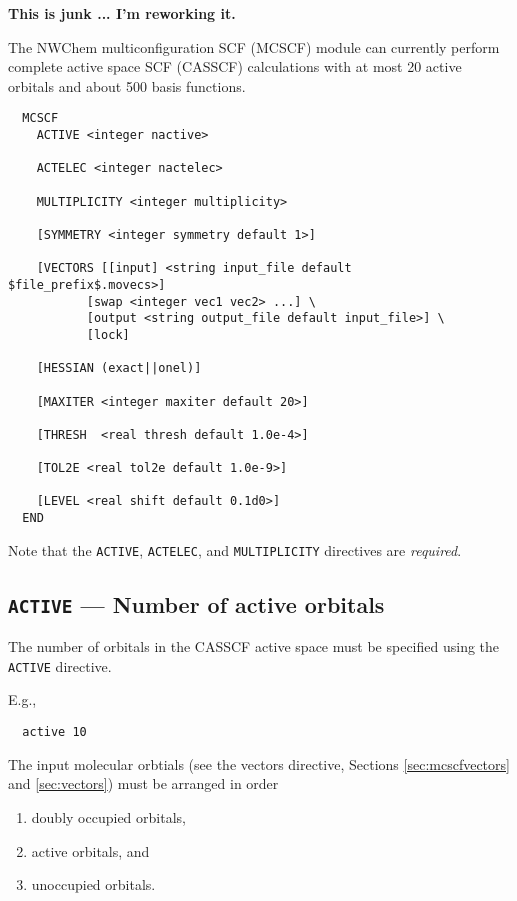 \label{sec:mcscf}

{\bf This is junk ... I'm reworking it.}

The NWChem multiconfiguration SCF (MCSCF) module can currently perform
complete active space SCF (CASSCF) calculations with at most 20 active
orbitals and about 500 basis functions.

\begin{verbatim}
  MCSCF
    ACTIVE <integer nactive>

    ACTELEC <integer nactelec>

    MULTIPLICITY <integer multiplicity>

    [SYMMETRY <integer symmetry default 1>]

    [VECTORS [[input] <string input_file default $file_prefix$.movecs>] 
           [swap <integer vec1 vec2> ...] \
           [output <string output_file default input_file>] \
           [lock]

    [HESSIAN (exact||onel)]

    [MAXITER <integer maxiter default 20>]

    [THRESH  <real thresh default 1.0e-4>]

    [TOL2E <real tol2e default 1.0e-9>]

    [LEVEL <real shift default 0.1d0>]
  END
\end{verbatim}
Note that the \verb+ACTIVE+, \verb+ACTELEC+, and \verb+MULTIPLICITY+
directives are {\em required}.

\subsection{{\tt ACTIVE} --- Number of active orbitals}

The number of orbitals in the CASSCF active space must be specified
using the {\tt ACTIVE} directive.

E.g.,
\begin{verbatim}
  active 10
\end{verbatim}

The input molecular orbtials (see the vectors directive, Sections
\ref{sec:mcscfvectors} and \ref{sec:vectors}) must be arranged in
order
\begin{enumerate}
\item doubly occupied orbitals,
\item active orbitals, and
\item unoccupied orbitals.
\end{enumerate}

